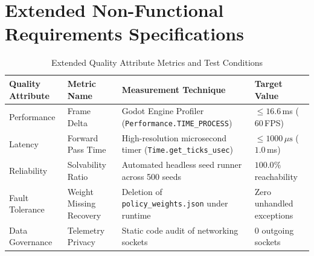 \section{Extended Non-Functional Requirements Specifications}

\begin{table}[!htbp]
\centering
\caption{Extended Quality Attribute Metrics and Test Conditions}
\label{tab:extended_nfr}
\small
\begin{tabular}{p{}p{}p{}p{}}
\toprule
\textbf{Quality Attribute} & \textbf{Metric Name} & \textbf{Measurement Technique} & \textbf{Target Value} \\
\midrule
Performance & Frame Delta & Godot Engine Profiler (\texttt{Performance.TIME\_PROCESS}) & $\le 16.6$\,ms ($60$\,FPS) \\
Latency & Forward Pass Time & High-resolution microsecond timer (\texttt{Time.get\_ticks\_usec}) & $\le 1000\,\mu\text{s}$ ($1.0$\,ms) \\
Reliability & Solvability Ratio & Automated headless seed runner across 500 seeds & $100.0\%$ reachability \\
Fault Tolerance & Weight Missing Recovery & Deletion of \texttt{policy\_weights.json} under runtime & Zero unhandled exceptions \\
Data Governance & Telemetry Privacy & Static code audit of networking sockets & $0$ outgoing sockets \\
\bottomrule
\end{tabular}
\end{table}
